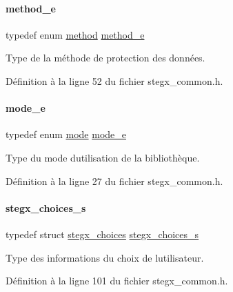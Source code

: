 \paragraph{\texorpdfstring{method\+\_\+e}{method\_e}}
{\footnotesize\ttfamily typedef enum \hyperlink{a00008_abed946c62f140eb7ff2ac742e6ad9497}{method} \hyperlink{a00008_ad7acd42acef1f832c261f34b380de326}{method\+\_\+e}}

Type de la méthode de protection des données. 

Définition à la ligne 52 du fichier stegx\+\_\+common.\+h.

\mbox{\label{a00008_a3410d2f61b2ebef290660e7d14215bbd}} 
\paragraph{\texorpdfstring{mode\+\_\+e}{mode\_e}}
{\footnotesize\ttfamily typedef enum \hyperlink{a00008_a1a6b6fb557d8d37d59700faf4e4c9167}{mode} \hyperlink{a00008_a3410d2f61b2ebef290660e7d14215bbd}{mode\+\_\+e}}

Type du mode d\textquotesingle{}utilisation de la bibliothèque. 

Définition à la ligne 27 du fichier stegx\+\_\+common.\+h.

\mbox{\label{a00008_ae5a2888ba8550edd4b6da33702b83a9d}} 
\paragraph{\texorpdfstring{stegx\+\_\+choices\+\_\+s}{stegx\_choices\_s}}
{\footnotesize\ttfamily typedef struct \hyperlink{a00142}{stegx\+\_\+choices} \hyperlink{a00008_ae5a2888ba8550edd4b6da33702b83a9d}{stegx\+\_\+choices\+\_\+s}}

Type des informations du choix de l\textquotesingle{}utilisateur. 

Définition à la ligne 101 du fichier stegx\+\_\+common.\+h.

\mbox{\label{a00008_a176cafec595278af1f86f1e9ef478cb0}} 
